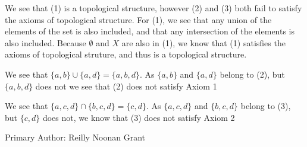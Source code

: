 We see that (1) is a topological structure, however (2) and (3) both
fail to satisfy the axioms of topological structure. For (1), we see
that any union of the elements of the set is also included, and that
any intersection of the elements is also included. Because $\emptyset$
and $X$ are also in (1), we know that (1) satisfies the axioms of
topological struture, and thus is a topological structure. 

We see that $\{a,b\} \cup \{a,d\} = \{a,b,d\}$. As $\{a,b\}$ and
$\{a,d\} $ belong to (2), but $\{a,b,d\}$ does not we see that (2) does not
satisfy Axiom 1

We see that $\{a,c,d\} \cap \{b,c,d\} =\{c,d\}$. As $\{a,c,d\}$
and $\{b,c,d\}$ belong to (3), but $\{c,d\}$ does not, we know that 
(3) does not satisfy Axiom 2


Primary Author: Reilly Noonan Grant


